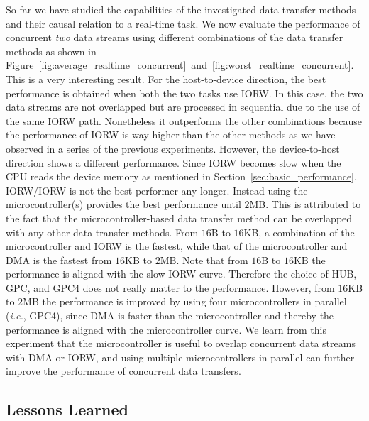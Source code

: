 So far we have studied the capabilities of the investigated data
transfer methods and their causal relation to a real-time task.
We now evaluate the performance of concurrent \textit{two} data streams
using different combinations of the data transfer methods as shown in
Figure~\ref{fig:average_realtime_concurrent}~and~\ref{fig:worst_realtime_concurrent}.
This is a very interesting result.
For the host-to-device direction, the best performance is obtained when
both the two tasks use \textsf{IORW}.
In this case, the two data streams are not overlapped but are processed
in sequential due to the use of the same \textsf{IORW} path.
Nonetheless it outperforms the other combinations because the
performance of \textsf{IORW} is way higher than the other methods as we
have observed in a series of the previous experiments.
However, the device-to-host direction shows a different performance.
Since \textsf{IORW} becomes slow when the CPU reads the device memory as
mentioned in Section~\ref{sec:basic_performance},
\textsf{IORW}/\textsf{IORW} is not the best performer any longer.
Instead using the microcontroller(s) provides the best performance until
$2$MB.
This is attributed to the fact that the microcontroller-based data
transfer method can be overlapped with any other data transfer methods.
From $16$B to $16$KB, a combination of the microcontroller and
\textsf{IORW} is the fastest, while that of the microcontroller and
\textsf{DMA} is the fastest from $16$KB to $2$MB.
Note that from $16$B to $16$KB the performance is aligned with the slow
\textsf{IORW} curve.
Therefore the choice of \textsf{HUB}, \textsf{GPC}, and \textsf{GPC4}
does not really matter to the performance.
However, from $16$KB to $2$MB the performance is improved by using four
microcontrollers in parallel (\textit{i.e.}, \textsf{GPC4}), since
\textsf{DMA} is faster than the microcontroller and
thereby the performance is aligned with the microcontroller curve.
We learn from this experiment that the microcontroller is useful to
overlap concurrent data streams with \textsf{DMA} or \textsf{IORW}, and
using multiple microcontrollers in parallel can further improve the
performance of concurrent data transfers.

\subsection{Lessons Learned}
\label{sec:discussion}

